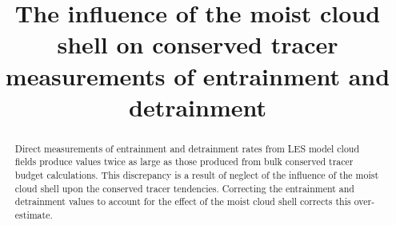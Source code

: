 \documentclass[draft,grl]{AGUTeX}
\begin{document}
%
%


\title{The influence of the moist cloud shell on conserved tracer measurements 
of entrainment and detrainment}
%

%
%






%
%


\begin{abstract}
Direct measurements of entrainment and detrainment rates from LES model 
cloud fields produce values twice as large as those produced from bulk 
conserved tracer budget calculations.  This discrepancy is a result of 
neglect of the influence of the moist cloud shell upon the conserved 
tracer tendencies.  Correcting the entrainment and detrainment values 
to account for the effect of the moist cloud shell corrects this 
over-estimate.  
\end{abstract}

%
%

%
\end{document}
